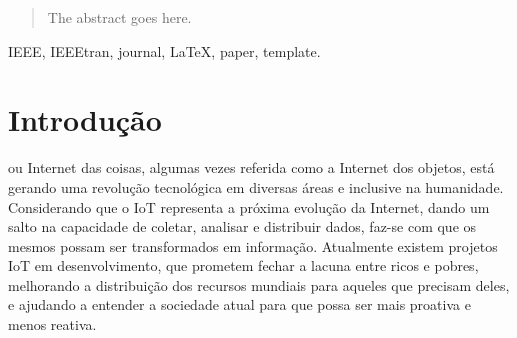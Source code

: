 \documentclass[journal]{IEEEtran}
\begin{document}







\maketitle

\begin{abstract}
The abstract goes here.
\end{abstract}

\begin{IEEEkeywords}
IEEE, IEEEtran, journal, \LaTeX, paper, template.
\end{IEEEkeywords}






%
\IEEEpeerreviewmaketitle



\section{Introdução}
% 
% 
% 
% 
 ou Internet das coisas, algumas vezes referida como a Internet dos objetos, está gerando uma revolução tecnológica em diversas áreas e inclusive na humanidade. Considerando que o IoT representa a próxima evolução da Internet, dando um salto na capacidade de coletar, analisar e distribuir dados, faz-se com que os mesmos possam ser transformados em informação. Atualmente existem projetos IoT em desenvolvimento, que prometem fechar a lacuna entre ricos e pobres, melhorando a distribuição dos recursos mundiais para aqueles que precisam deles, e ajudando a entender a sociedade atual para que possa ser mais proativa e menos reativa. \cite[p.~2]{Evans}
\end{document}
